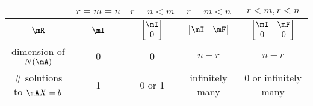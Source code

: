 \documentclass[11pt]{article}
\theoremstyle{plain}
\theoremstyle{definition}
\begin{document}
\begin{center}
\begin{tabular}{ c|c |c| c |c } 
 \hline
  & $r = m=n$ & $r = n < m$ & $r = m < n$ & $r<m,r<n$ \\ \hline 
  $\mR$& $\mI$ & $\begin{bmatrix} \mI \\ 0	\end{bmatrix}$ & $\begin{bmatrix} \mI & \mF \end{bmatrix}$ & $\begin{bmatrix} \mI & \mF \\ 0 &0	\end{bmatrix}$\\
  dimension of $N(\mA)$& 0 &0& $n -r$ & $n-r$ \\
  \# solutions to $\mA X = b$ & 1 & 0 or 1 & infinitely many & 0 or infinitely many\\
 \hline
\end{tabular}
\end{center}



\vspace{.2cm}
\end{document}
